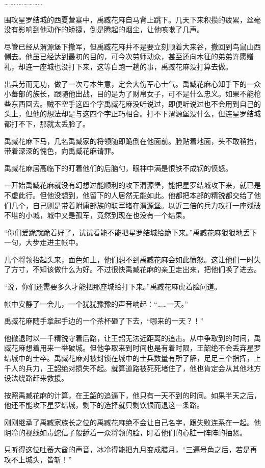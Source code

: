 ……………………

围攻星罗结城的西夏营寨中，禹臧花麻自马背上跳下。几天下来积攒的疲累，丝毫没有影响到他动作的矫捷，倒是腾起的烟尘，让他咳嗽了几声。

尽管已经从渭源堡下撤军，但禹臧花麻并不是要立刻顺着大来谷，撤回到鸟鼠山西侧去。他虽已经达到最初的目的，可今次劳师动众，甚至还向木征的弟弟许愿赠礼，却连一座城也没打下来，这等白跑一趟的事，禹臧花麻没打算去做。

出兵劳而无功，做了一次亏本生意，定会大伤军心士气。禹臧花麻心知手下的一众小蕃部的族长，跟随他出战，目的是为了财帛女子，可不是什么忠义。如果不能枪些东西回去。贼不空手这四个字禹臧花麻没听说过，即便听说过也不会用到自己的头上，但他的想法却是与这四个字正巧相合。打不下渭源堡没什么，但连星罗结城都打不下，那就太丢脸了。

禹臧花麻下马，几名禹臧家的将领随即跪倒在他面前。脸贴着地面，头不敢稍抬，带着深深的愧色，向禹臧花麻请罪。

禹臧花麻居高临下的盯着他们的后脑勺，眼神中满是恨铁不成钢的愤怒。

一开始禹臧花麻就没有幻想过能顺利的攻下渭源堡，能把星罗结城攻下来，就已是不虚此行。但他没想到，他留下的人居然无能如此。他都把本部的精锐都交给了他们几个，自己则是带着附庸部族的联军堵在渭源堡。以近三倍的兵力攻打一座残破不堪的小城，城中又是孤军，竟然到现在也没有一个结果。

“你们爱跪就跪着好了，试试看能不能把星罗结城给跪下来。”禹臧花麻狠狠地丢下一句，大步走进主帐中。

几个将领抬起头来，面色如土，他们想不到禹臧花麻会如此愤怒。这让他们一时失了方寸，不知该做什么为好。不过很快禹臧花麻的亲卫走出来，把他们唤了进去。

“说，你们还需要多久才能把那座城给打下来。”禹臧花麻虎着脸问道。

帐中安静了一会儿，一个犹犹豫豫的声音响起：“……一天。”

禹臧花麻随手拿起手边的一个茶杯砸了下去，“哪来的一天？！”

他撤退时以一千精锐守着后路，让王韶无法近距离的追击。从中争取到的时间，禹臧花麻想着用来一举破城。但他争取来到时间也是有着时限，王韶绝不会丢弃星罗结城中的士卒。禹臧花麻对被封锁在城中的士兵数量有所了解，足足三个指挥，上千人的兵力，王韶绝对损失不起。就算道路被死死堵住了，他也肯定会从其他地方设法绕路赶来救援。

按照禹臧花麻的计算，在王韶的追逼下，他只有一天不到的时间。如果半天之后，他还不能攻下星罗结城，剩下的选择就只剩饮恨而退这一条路。

刚刚继承了禹臧家族长之位的禹臧花麻绝不会让自己名字，跟失败连系在一起。他阴冷的视线如毒蛇信子般舔着一众将领的脸，盯着他们的心脏一阵阵的抽紧。

只听得这位吐蕃大酋的声音，冰冷得能把九月变成腊月，“三遍号角之后，若是再攻不上城头，皆斩！”

